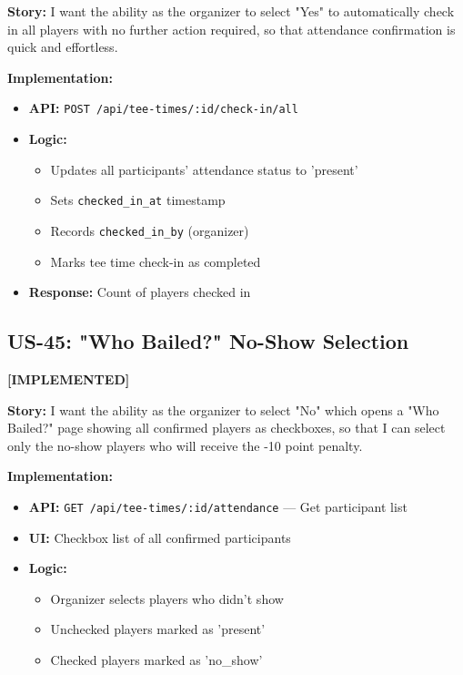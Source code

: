 \documentclass[11pt,a4paper]{article}
\newcommand{\implemented}{\textcolor{implemented}{\textbf{[IMPLEMENTED]}}}
\begin{document}
\textbf{Story:} I want the ability as the organizer to select "Yes" to automatically check in all players with no further action required, so that attendance confirmation is quick and effortless.

\textbf{Implementation:}
\begin{itemize}[leftmargin=*]
  \item \textbf{API:} \texttt{POST /api/tee-times/:id/check-in/all}
  \item \textbf{Logic:}
    \begin{itemize}
      \item Updates all participants' attendance status to 'present'
      \item Sets \texttt{checked\_in\_at} timestamp
      \item Records \texttt{checked\_in\_by} (organizer)
      \item Marks tee time check-in as completed
    \end{itemize}
  \item \textbf{Response:} Count of players checked in
\end{itemize}

\subsection{US-45: "Who Bailed?" No-Show Selection}
\implemented

\textbf{Story:} I want the ability as the organizer to select "No" which opens a "Who Bailed?" page showing all confirmed players as checkboxes, so that I can select only the no-show players who will receive the -10 point penalty.

\textbf{Implementation:}
\begin{itemize}[leftmargin=*]
  \item \textbf{API:} \texttt{GET /api/tee-times/:id/attendance} --- Get participant list
  \item \textbf{UI:} Checkbox list of all confirmed participants
  \item \textbf{Logic:}
    \begin{itemize}
      \item Organizer selects players who didn't show
      \item Unchecked players marked as 'present'
      \item Checked players marked as 'no\_show'
    \end{itemize}
\end{itemize}
\end{document}
